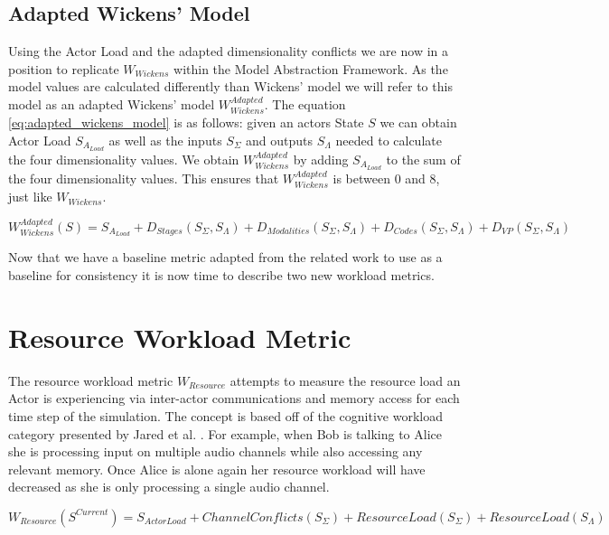 \subsection{Adapted Wickens' Model}
Using the Actor Load and the adapted dimensionality conflicts we are now in a position to replicate $W_{Wickens}$ within the Model Abstraction Framework.  As the model values are calculated differently than Wickens' model we will refer to this model as an adapted Wickens' model $W_{Wickens}^{Adapted}$.  The equation \ref{eq:adapted_wickens_model} is as follows: given an actors State $S$ we can obtain Actor Load $S_{A_{Load}}$ as well as the inputs $S_{\Sigma}$ and outputs $S_{\Lambda}$ needed to calculate the four dimensionality values.  We obtain $W_{Wickens}^{Adapted}$ by adding $S_{A_{Load}}$  to the sum of the four dimensionality values.  This ensures that $W_{Wickens}^{Adapted}$ is between 0 and 8, just like $W_{Wickens}$.

\begin{equation}
  W_{Wickens}^{Adapted}(S) = S_{A_{Load}} + D_{Stages}(S_{\Sigma}, S_{\Lambda}) + D_{Modalities}(S_{\Sigma}, S_{\Lambda}) + D_{Codes}(S_{\Sigma}, S_{\Lambda}) + D_{VP}(S_{\Sigma}, S_{\Lambda})
  \label{eq:adapted_wickens_model}
\end{equation}

Now that we have a baseline metric adapted from the related work to use as a baseline for consistency it is now time to describe two new workload metrics.

\section{Resource Workload Metric}

The resource workload metric $W_{Resource}$ attempts to measure the resource load an Actor is experiencing via inter-actor communications and memory access for each time step of the simulation.  The concept is based off of the cognitive workload category presented by Jared et al. \cite{moore2014modeling}.  For example, when Bob is talking to Alice she is processing input on multiple audio channels while also accessing any relevant memory.  Once Alice is alone again her resource workload will have decreased as she is only processing a single audio channel.

\begin{equation}
  W_{Resource}(S^{Current}) = S_{Actor Load} + ChannelConflicts(S_{\Sigma}) + ResourceLoad(S_{\Sigma}) + ResourceLoad(S_{\Lambda})
  \label{eq:resourceworkload}
\end{equation}

